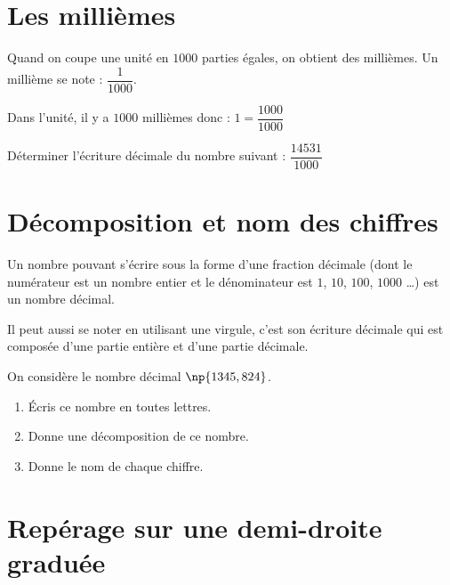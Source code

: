 \documentclass[a4paper,10pt]{report}
\begin{document}
\section{Les millièmes}


\begin{defn}
Quand on coupe une unité en $1 000$ parties égales, on obtient des millièmes. Un millième se note : $\dfrac{1}{1000}$. 

\noindent Dans l'unité, il y a $1 000$ millièmes donc : $1=\dfrac{1000}{1000}$
\end{defn}

\begin{ex}
Déterminer l'écriture décimale du nombre suivant : $\dfrac{14531}{1000}$

\medskip \noindent \noindent\grandscarreaux{\linewidth}{1.6cm}
\end{ex}

\section{Décomposition et nom des chiffres}

\begin{defn}
Un nombre pouvant s'écrire sous la forme d'une fraction décimale (dont le numérateur est un nombre entier et le dénominateur est $1$, $10$, $100$, $1000$ \dots) est un nombre décimal.

\noindent Il peut aussi se noter en utilisant une virgule, c'est son écriture décimale qui est composée d'une partie entière et d'une partie décimale.
\end{defn}

\begin{ex}
On considère le nombre décimal $\np{1 345,824}$.
\begin{enumerate}
\item Écris ce nombre en toutes lettres.
\item Donne une décomposition de ce nombre.
\item Donne le nom de chaque chiffre.
\end{enumerate} 
\medskip \noindent\grandscarreaux{\linewidth}{5.8cm}
\end{ex}

\section{Repérage sur une demi-droite graduée}
\end{document}
